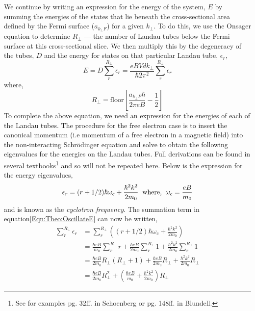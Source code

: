 We continue by writing an expression for the energy of the system, $E$ by summing the energies of the states that lie beneath the cross-sectional area defined by the Fermi surface ($a_{k_\perp F}$) for a given $k_\perp$. To do this, we use the Onsager equation to determine $R_\perp$ --- the number of Landau tubes below the Fermi surface at this cross-sectional slice. We then multiply this by the degeneracy of the tubes, $D$ and the energy for states on that particular Landau tube, $\epsilon_r$,
\begin{equation}
\label{Eqn:Theo:OscillateE}
E = D\sum_{r}^{R_\perp}\epsilon_r = \frac{eBVdk_\perp}{\hbar 2 \pi^2}\sum_{r}^{R_\perp}\epsilon_r
\end{equation}
 where,
\begin{equation}
R_\perp = \textrm{floor}\left[\frac{a_{k_\perp F}\hbar}{2\pi e B} - \frac{1}{2}\right]
\end{equation}
To complete the above equation, we need an expression for the energies of each of the Landau tubes. The procedure for the free electron case is to insert the canonical momentum (i.e momentum of a free electron in a magnetic field) into the non-interacting Schr\"odinger equation and solve to obtain the following eigenvalues for the energies on the Landau tubes. Full derivations can be found in several textbooks\footnote{See for examples pg. 32ff. in Schoenberg\cite{Schoenberg1984} or pg. 148ff. in Blundell\cite{Blundell2001}.} and so will  not be repeated here. Below is the expression for the energy eigenvalues,
\begin{equation}
\epsilon_r=(r+1/2) \hbar \omega_c + \frac{\hbar^2 k^2}{2m_0} \textrm{\hspace{0.2cm}where,\hspace{0.2cm}} \omega_c = \frac{eB}{m_0}
\end{equation}
and is known as the \textit{cyclotron frequency}. The summation term in equation\ref{Eqn:Theo:OscillateE} can now be written,
\begin{align*}
\sum_r^{R_\perp}\epsilon_r &= \sum_r^{R_\perp}\left( (r+1/2) \hbar \omega_c + \frac{\hbar^2 k^2}{2m_0} \right) \\
    &= \frac{\hbar eB}{m_0}\sum_r^{R_\perp}r + \frac{\hbar eB}{2m_0}\sum_r^{R_\perp}1 + \frac{\hbar^2 k^2}{2m_0}\sum_r^{R_\perp}1 \\
    &= \frac{\hbar eB}{2 m_0} R_\perp(R_\perp + 1) + \frac{\hbar eB}{2m_0}R_\perp + \frac{\hbar^2 k^2}{2m_0}R_\perp \\
    &= \frac{\hbar eB}{2m_0}R_\perp^2 + \left(\frac{\hbar eB}{m_0} + \frac{\hbar^2 k^2}{2m_0}\right)R_\perp
\end{align*}
